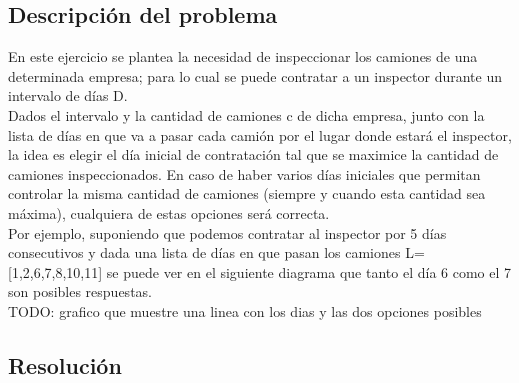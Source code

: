 \subsection{Descripci\'on del problema}

En este ejercicio se plantea la necesidad de inspeccionar los camiones de una determinada empresa; para lo cual se puede contratar a un inspector durante un intervalo de d\'ias D. \\ 
Dados el intervalo y la cantidad de camiones c de dicha empresa, junto con la lista de d\'ias en que va a pasar cada cami\'on por el lugar donde estar\'a el inspector, la idea es elegir el d\'ia inicial de contrataci\'on tal que se maximice la cantidad de camiones inspeccionados. En caso de haber varios d\'ias iniciales que permitan controlar la misma cantidad de camiones (siempre y cuando esta cantidad sea m\'axima), cualquiera de estas opciones ser\'a correcta. \\

Por ejemplo, suponiendo que podemos contratar al inspector por 5 d\'ias consecutivos y dada una lista de d\'ias en que pasan los camiones L=[1,2,6,7,8,10,11] se puede ver en el siguiente diagrama que tanto el d\'ia 6 como el 7 son posibles respuestas.\\

TODO: grafico que muestre una linea con los dias y las dos opciones posibles

\subsection{Resoluci\'on}

